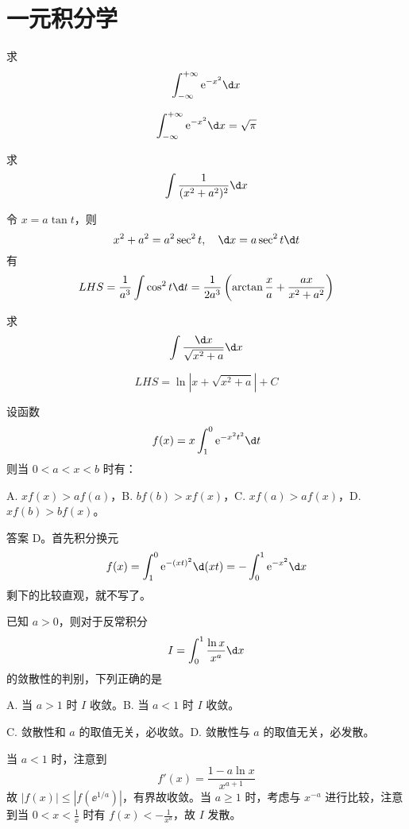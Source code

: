 \section{一元积分学}

\begin{problem}[000008]
求
\[ \int_{-\infty}^{+\infty} \ee^{-x^2}\d x \]
\end{problem}
\begin{solution}
	\[ \int_{-\infty}^{+\infty} \ee^{-x^2}\d x = \sqrt{\pi} \]
\end{solution}

\begin{problem}[000014]
求
\[ \int \frac{1}{(x^2+a^2)^2} \d x \]
\end{problem}
\begin{solution}
	令 $x = a \tan t$，则
	\[ x^2 + a^2 = a^2 \sec^2 t, \quad \d x = a \sec^2 t \d t \]
	有
	\[ LHS =  \frac{1}{a^3}\int \cos^2 t \d t = \frac{1}{2a^3} \left( \arctan \frac{x}{a} + \frac{ax}{x^2+a^2} \right) \]
\end{solution}


\begin{problem}[000015]
求
\[ \int \frac{\d x}{\sqrt{x^2 + a}} \d x \]
\end{problem}
\begin{solution}
	\[ LHS =  \ln |x + \sqrt{x^2+a}| + C \]
\end{solution}


\begin{problem}[000022]
设函数
\[ f(x) = x \int_{1}^{0} \ee^{-x^2t^2} \d t \]
则当 $0<a<x<b$ 时有：

A. $xf(x) > af(a)$，B. $bf(b) > x f(x)$，C. $xf(a) > af(x)$，D. $xf(b) > bf(x)$。
\end{problem}

\begin{solution}
	答案 D。首先积分换元
	\[ f(x) = \int_{1}^{0} \ee^{-(xt)^2} \d (xt) = -\int_{0}^{1} \ee^{-x^2} \d x  \]
	剩下的比较直观，就不写了。
\end{solution}


\begin{problem}[000027]
已知 $a > 0$，则对于反常积分
\[ I = \int_{0}^{1} \frac{\ln x}{x^a} \d x \]
的敛散性的判别，下列正确的是

A. 当 $a > 1$ 时 $I$ 收敛。B. 当 $a < 1$ 时 $I$ 收敛。

C. 敛散性和 $a$ 的取值无关，必收敛。D. 敛散性与 $a$ 的取值无关，必发散。
\end{problem}
\begin{solution}
	当 $a < 1$ 时，注意到
	\[ f'(x) = \frac{1 - a \ln x}{x^{a+1}} \]
	故 $|f(x)| \leqslant |f(\ee^{1/a})|$，有界故收敛。当 $a \geqslant 1$ 时，考虑与 $x^{-a}$ 进行比较，注意到当 $0 < x < \frac{1}{\ee}$ 时有 $f(x) < -\frac{1}{x^a}$，故 $I$ 发散。
\end{solution}

